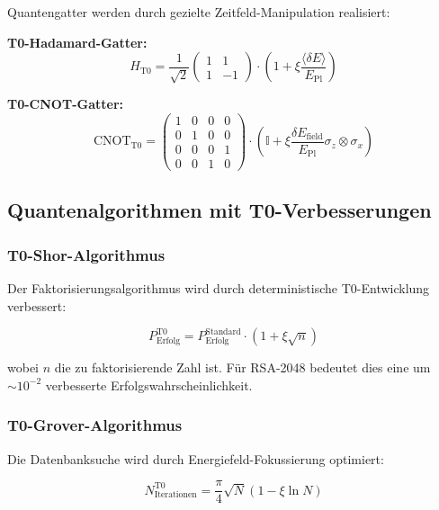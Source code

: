 \documentclass[12pt,a4paper]{article}
\newcommand{\Efield}{E_{\text{field}}}
\newcommand{\xipar}{\xi}
\newcommand{\deltaE}{\delta E}
\newcommand{\EPlanck}{E_{\text{Pl}}}
\begin{document}
	Quantengatter werden durch gezielte Zeitfeld-Manipulation realisiert:
	
	\textbf{T0-Hadamard-Gatter:}
	\begin{equation}
		H_{\text{T0}} = \frac{1}{\sqrt{2}}\begin{pmatrix} 1 & 1 \\ 1 & -1 \end{pmatrix} \cdot \left(1 + \xipar \frac{\langle\deltaE\rangle}{\EPlanck}\right)
	\end{equation}
	
	\textbf{T0-CNOT-Gatter:}
	\begin{equation}
		\text{CNOT}_{\text{T0}} = \begin{pmatrix} 1 & 0 & 0 & 0 \\ 0 & 1 & 0 & 0 \\ 0 & 0 & 0 & 1 \\ 0 & 0 & 1 & 0 \end{pmatrix} \cdot \left(\mathbb{I} + \xipar \frac{\delta\Efield}{\EPlanck} \sigma_z \otimes \sigma_x\right)
	\end{equation}
	
	\subsection{Quantenalgorithmen mit T0-Verbesserungen}
	
	\subsubsection{T0-Shor-Algorithmus}
	
	Der Faktorisierungsalgorithmus wird durch deterministische T0-Entwicklung verbessert:
	
	\begin{equation}
		P_{\text{Erfolg}}^{\text{T0}} = P_{\text{Erfolg}}^{\text{Standard}} \cdot \left(1 + \xipar \sqrt{n}\right)
	\end{equation}
	
	wobei $n$ die zu faktorisierende Zahl ist. Für RSA-2048 bedeutet dies eine um $\sim 10^{-2}$ verbesserte Erfolgswahrscheinlichkeit.
	
	\subsubsection{T0-Grover-Algorithmus}
	
	Die Datenbanksuche wird durch Energiefeld-Fokussierung optimiert:
	
	\begin{equation}
		N_{\text{Iterationen}}^{\text{T0}} = \frac{\pi}{4}\sqrt{N} \left(1 - \xipar \ln N\right)
	\end{equation}
	
\end{document}
